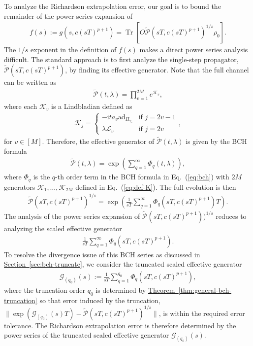 \documentclass[aps,pra,reprint,groupedaddress,floatfix]{revtex4-2}
\newcommand{\eq}[1]{(\ref{eq:#1})}
\newcommand{\thm}[1]{\hyperref[thm:#1]{Theorem~\ref*{thm:#1}}}
\renewcommand{\sec}[1]{\hyperref[sec:#1]{Section~\ref*{sec:#1}}}
\renewcommand{\i}{\mathrm{i}}
\newcommand{\ad}{\mathrm{ad}}
\newcommand{\G}{\mathcal{G}}
\newcommand{\mc}{\mathcal}
\begin{document}
To analyze the Richardson extrapolation error, our goal is to bound the remainder of the power series expansion of \begin{align*}
    f(s):= g(s, c(sT)^{p+1}) =  \operatorname{Tr}[O\tilde{\mc P}(sT,c(sT)^{p+1})^{1/s}\rho_0].
\end{align*}
The $1/s$ exponent in the definition of $f(s)$ makes a direct power series analysis difficult. The standard approach is to first analyze the single-step propagator, $\tilde{\mc P}(sT,c(sT)^{p+1})$, by finding its effective generator. Note that the full channel can be written as \begin{align*}
    \tilde{\mc P}(t,\lambda) = \prod_{v=1}^{2M} e^{\mc K_{v}},
\end{align*} where each $\mc K_v$ is a Lindbladian defined as 
\begin{align}
 	\mathcal{K}_j= \begin{cases}-\i ta_{v}\ad_{H_{\gamma_v}} & \text{if } j = 2v-1\\ \lambda\mathcal{L}_v & \text{if } j = 2v \end{cases}, 	\label{eq:def-K}
\end{align}
for $v \in [M]$. Therefore, the effective generator of $\tilde{\mc P}(t,\lambda)$ is given by the BCH formula
\begin{align*}
    \tilde{\mc P}(t,\lambda)  = \exp\left(\sum_{q=1}^\infty \Phi_q(t,\lambda)\right),
\end{align*}
where $\Phi_q$ is the $q$-th order term in the BCH formula in Eq.~\eq{bch} with $2M$ generators $\mc K_1, \ldots, \mc K_{2M}$ defined in Eq.~\eq{def-K}.
The full evolution is then \begin{align*}
    \tilde{\mc P}(sT,c(sT)^{p+1})^{1/s} = \exp(\frac{1}{sT}\sum_{q=1}^\infty \Phi_q(sT,c(sT)^{p+1}) T). 
\end{align*}
The analysis of the power series expansion of $\tilde{\mc P}(sT,c(sT)^{p+1}))^{1/s}$ reduces to analyzing the scaled effective generator \begin{align*}
    \frac{1}{sT} \sum_{q=1}^\infty \Phi_q(sT,c(sT)^{p+1}).
\end{align*}
To resolve the divergence issue of this BCH series as discussed in \sec{bch-truncate}, we consider the truncated scaled effective generator \begin{align}
\label{eq:def-effect-generator}
    \G_{(q_0)}(s) := \frac{1}{sT} \sum_{q=1}^{q_0} \Phi_q(sT,c(sT)^{p+1}),
\end{align}
where the truncation order $q_0$ is determined by \thm{general-bch-truncation} so that error induced by the truncation, $\|\exp({\G_{(q_0)}(s)T})-\tilde{\mc P}(sT,c(sT)^{p+1})^{1/s}\|$, is within the required error tolerance.
The Richardson extrapolation error is therefore determined by the power series of the truncated scaled effective generator $\G_{(q_0)}(s)$.
\end{document}
